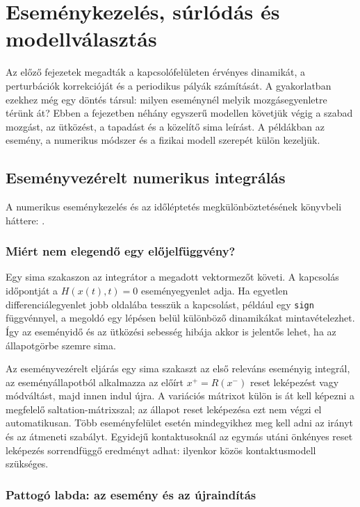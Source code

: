 \chapter{Eseménykezelés, súrlódás és modellválasztás}\label{sec:practical}
Az előző fejezetek megadták a kapcsolófelületen érvényes dinamikát, a perturbációk korrekcióját és a periodikus pályák számítását. A gyakorlatban ezekhez még egy döntés társul: milyen eseménynél melyik mozgásegyenletre térünk át? Ebben a fejezetben néhány egyszerű modellen követjük végig a szabad mozgást, az ütközést, a tapadást és a közelítő sima leírást. A példákban az esemény, a numerikus módszer és a fizikai modell szerepét külön kezeljük.

\section{Eseményvezérelt numerikus integrálás}\label{sec:event_numerics}
A numerikus eseménykezelés és az időléptetés megkülönböztetésének könyvbeli háttere: \cite[2.6.1. szakasz]{dib}.

\subsection{Miért nem elegendő egy előjelfüggvény?}
Egy sima szakaszon az integrátor a megadott vektormezőt követi. A kapcsolás időpontját a $H(x(t),t)=0$ eseményegyenlet adja. Ha egyetlen differenciálegyenlet jobb oldalába tesszük a kapcsolást, például egy \texttt{sign} függvénnyel, a megoldó egy lépésen belül különböző dinamikákat mintavételezhet. Így az eseményidő és az ütközési sebesség hibája akkor is jelentős lehet, ha az állapotgörbe szemre sima.

Az eseményvezérelt eljárás egy sima szakaszt az első releváns eseményig integrál, az eseményállapotból alkalmazza az előírt $x^+=R(x^-)$ reset leképezést vagy módváltást, majd innen indul újra. A variációs mátrixot külön is át kell képezni a megfelelő saltation-mátrixszal; az állapot reset leképezésa ezt nem végzi el automatikusan. Több eseményfelület esetén mindegyikhez meg kell adni az irányt és az átmeneti szabályt. Egyidejű kontaktusoknál az egymás utáni önkényes reset leképezés sorrendfüggő eredményt adhat: ilyenkor közös kontaktusmodell szükséges.

\subsection{Pattogó labda: az esemény és az újraindítás}
\examplebody

